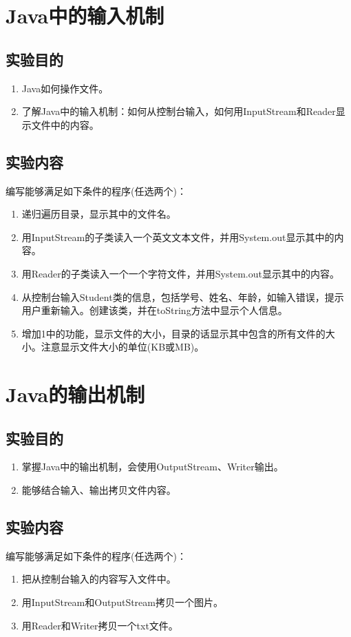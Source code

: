 ﻿\documentclass[cs5size,b5paper,nofonts,twoside]{ctexart}
\begin{document}
\clearpage
\section{Java中的输入机制}
\subsection{实验目的}
\begin{enumerate}
\item Java如何操作文件。
\item 了解Java中的输入机制：如何从控制台输入，如何用InputStream和Reader显示文件中的内容。
\end{enumerate}
\subsection{实验内容}
编写能够满足如下条件的程序(任选两个)：
\begin{enumerate}
\item 递归遍历目录，显示其中的文件名。
\item 用InputStream的子类读入一个英文文本文件，并用System.out显示其中的内容。
\item 用Reader的子类读入一个一个字符文件，并用System.out显示其中的内容。
\item 从控制台输入Student类的信息，包括学号、姓名、年龄，如输入错误，提示用户重新输入。创建该类，并在toString方法中显示个人信息。
\item 增加1中的功能，显示文件的大小，目录的话显示其中包含的所有文件的大小。注意显示文件大小的单位(KB或MB)。
\end{enumerate}

\section{Java的输出机制}
\hfill{}
\subsection{实验目的}
\begin{enumerate}
\item 掌握Java中的输出机制，会使用OutputStream、Writer输出。
\item 能够结合输入、输出拷贝文件内容。
\end{enumerate}
\subsection{实验内容}
编写能够满足如下条件的程序(任选两个)：
\begin{enumerate}
\item 把从控制台输入的内容写入文件中。
\item 用InputStream和OutputStream拷贝一个图片。
\item 用Reader和Writer拷贝一个txt文件。
\end{enumerate}
\end{document}
